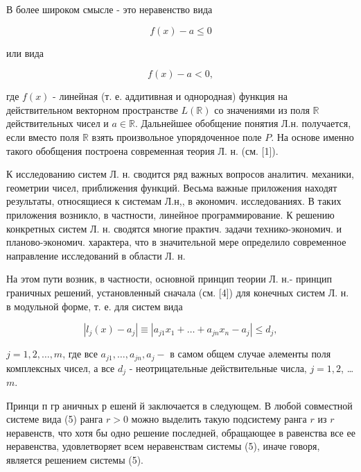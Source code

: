 \documentclass[10pt]{article}
\begin{document}
В более широком смысле - это неравенство вида



\[

f(x)-a \leqslant 0

\]



или вида



\[

f(x)-a<0,

\]



где $f(x)$ - линейная (т. е. аддитивная и однородная) функция на действительном векторном пространстве $L(\mathbb{R})$ со значениями из поля $\mathbb{R}$ действительных чисел и $a \in \mathbb{R}$. Дальнейшее обобщение понятия Л.н. получается, если вместо поля $\mathbb{R}$ взять произвольное упорядоченное поле $P$. На основе именно такого обобщения построена современная теория Л. н. (см. [1]).



К исследованию систем Л. н. сводится ряд важных вопросов аналитич. механики, геометрии чисел, приближения функций. Весьма важные приложения находят результаты, относящиеся к системам Л.н,, в әкономич. исследованиях. В таких приложения возникло, в частности, линейное программирование. К решению конкретных систем Л. н. сводятся многие практич. задачи технико-экономич. и планово-экономич. характера, что в значительной мере определило современное направление исследований в области Л. н.



На этом пути возник, в частности, основной принцип теории Л. н.- принцип граничных решений, установленный сначала (см. [4]) для конечных систем Л. н. в модульной форме, т. е. для систем вида



\[

\left|l_{j}(x)-a_{j}\right| \equiv\left|a_{j 1} x_{1}+\ldots+a_{j n} x_{n}-a_{j}\right| \leqslant d_{j},

\]



$j=1,2, \ldots, m$, где все $a_{j 1}, \ldots, a_{j n}, a_{j}-$ в самом общем случае әлементы поля комплексных чисел, а все $d_{j}$ - неотрицательные действительные числа, $j=1,2$, … $m$.



Принци п гр аничных р ешенй й заключается в следующем. В любой совместной системе вида (5) ранга $r>0$ можно выделить такую подсистему ранга $r$ из $r$ неравенств, что хотя бы одно решение последней, обращающее в равенства все ее неравенства, удовлетворяет всем неравенствам системы (5), иначе говоря, является решением системы (5).
\end{document}
